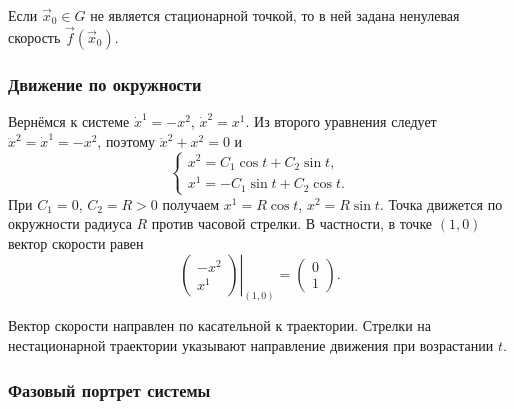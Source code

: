 \documentclass[12pt,a4paper]{article}
\numberwithin{equation}{section}
\newcommand{\vect}[1]{\vec{#1}}
\DeclareRobustCommand{\examtag}[1]{\space{\normalfont\small\color{HSEgray}(#1)}}
\begin{document}
Если $\vect{x}_0\in G$ не является стационарной точкой, то в ней
задана ненулевая скорость $\vect f(\vect{x}_0)$.

\subsubsection{Движение по окружности\examtag{пример к вопросу~3}}

\begin{exampleHSE}
Вернёмся к системе $\dot{x}^1=-x^2$, $\dot{x}^2=x^1$.
Из второго уравнения следует $\ddot{x}^2=\dot{x}^1=-x^2$, поэтому
$\ddot{x}^2+x^2=0$ и
\[
 \begin{cases}
 x^2=C_1\cos t+C_2\sin t,\\
 x^1=-C_1\sin t+C_2\cos t.
 \end{cases}
\]
При $C_1=0$, $C_2=R>0$ получаем $x^1=R\cos t$, $x^2=R\sin t$.
Точка движется по окружности радиуса $R$ против часовой стрелки.
В частности, в точке $(1,0)$ вектор скорости равен
\[
 \left.\begin{pmatrix}-x^2\\x^1\end{pmatrix}\right|_{(1,0)}
 =\begin{pmatrix}0\\1\end{pmatrix}.
\]
\begin{center}
\end{center}
\end{exampleHSE}

Вектор скорости направлен по касательной к траектории. Стрелки на
нестационарной траектории указывают направление движения при возрастании $t$.

\subsubsection{Фазовый портрет системы}
\end{document}
